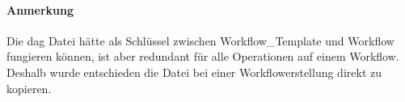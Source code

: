 \paragraph{Anmerkung} Die dag Datei hätte als Schlüssel zwischen Workflow\_Template und Workflow fungieren können, ist aber redundant für alle Operationen auf einem Workflow.
Deshalb wurde entschieden die Datei bei einer Workflowerstellung direkt zu kopieren.


\newpage